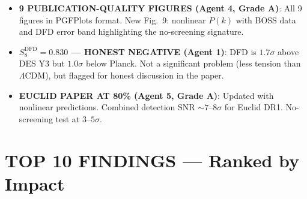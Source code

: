 \documentclass[11pt,a4paper]{article}
\begin{document}
\begin{itemize}
\item \textbf{9 PUBLICATION-QUALITY FIGURES (Agent 4, Grade A)}: All 9 figures in PGFPlots format. New Fig.~9: nonlinear $P(k)$ with BOSS data and DFD error band highlighting the no-screening signature.

\item \textbf{$S_8^{\mathrm{DFD}} = 0.830$ --- HONEST NEGATIVE (Agent 1)}: DFD is $1.7\sigma$ above DES Y3 but $1.0\sigma$ below Planck. Not a significant problem (less tension than $\Lambda$CDM), but flagged for honest discussion in the paper.

\item \textbf{EUCLID PAPER AT 80\% (Agent 5, Grade A)}: Updated with nonlinear predictions. Combined detection SNR $\sim 7$--$8\sigma$ for Euclid DR1. No-screening test at $3$--$5\sigma$.
\end{itemize}


\section{TOP 10 FINDINGS --- Ranked by Impact}
\label{sec:top10}
\end{document}
